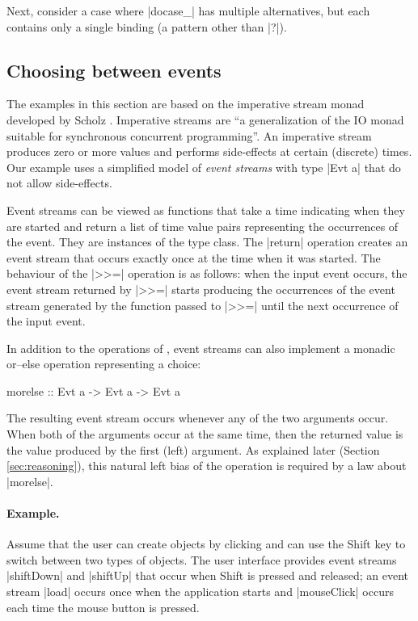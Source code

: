 \documentclass{sigplanconf}
\begin{document}
Next, consider a case where |docase_| has multiple alternatives, but each contains only a single
binding (a pattern other than |?|).


\subsection{Choosing between events}
\label{sec:intro-choosing-events}

The examples in this section are based on the imperative stream monad developed by Scholz
\cite{imperative-streams}. Imperative streams are ``a generalization of the IO monad suitable for
synchronous concurrent programming''. An imperative stream produces zero or more values and 
performs side-effects at certain (discrete) times. Our example uses a simplified model of 
\textit{event streams} with type |Evt a| that do not allow side-effects.

Event streams can be viewed as functions that take a time indicating when they are started and return a list of 
time value pairs representing the occurrences of the event. They are instances of the  
type class. The |return| operation creates an event stream that occurs exactly once at the time when 
it was started. The behaviour of the |>>=| operation is as follows: when the input event occurs, the 
event stream returned by |>>=| starts producing the occurrences of the event stream generated by the 
function passed to |>>=| until the next occurrence of the input event.

In addition to the operations of , event streams can also implement a monadic or--else
operation representing a choice:

\begin{code}
morelse :: Evt a -> Evt a -> Evt a
\end{code}
The resulting event stream occurs whenever any of the two arguments occur. When both of the 
arguments occur at the same time, then the returned value is the value produced by the first (left)
argument. As explained later (Section \ref{sec:reasoning}), this natural left bias of the operation is 
required by a law about |morelse|.

\paragraph{Example.} Assume that the user can create objects by clicking and can use the Shift
key to switch between two types of objects. The user interface provides event 
streams |shiftDown| and |shiftUp| that occur when Shift is pressed and released; an event 
stream |load| occurs once when the application starts and |mouseClick| occurs each time the 
mouse button is pressed.
\end{document}
